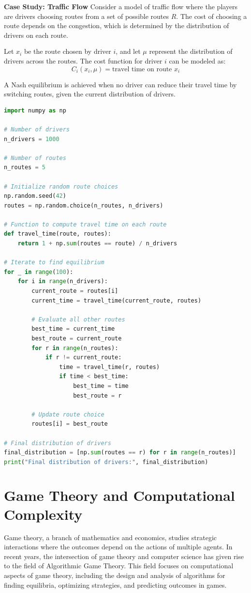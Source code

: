 \documentclass[12pt]{book} %
\begin{document}
\textbf{Case Study: Traffic Flow}
Consider a model of traffic flow where the players are drivers choosing routes from a set of possible routes $R$. The cost of choosing a route depends on the congestion, which is determined by the distribution of drivers on each route.

Let $x_i$ be the route chosen by driver $i$, and let $\mu$ represent the distribution of drivers across the routes. The cost function for driver $i$ can be modeled as:
\[
C_i(x_i, \mu) = \text{travel time on route } x_i
\]

A Nash equilibrium is achieved when no driver can reduce their travel time by switching routes, given the current distribution of drivers.

\FloatBarrier
\begin{lstlisting}[language=Python, caption=Simulation of Traffic Flow]
import numpy as np

# Number of drivers
n_drivers = 1000

# Number of routes
n_routes = 5

# Initialize random route choices
np.random.seed(42)
routes = np.random.choice(n_routes, n_drivers)

# Function to compute travel time on each route
def travel_time(route, routes):
    return 1 + np.sum(routes == route) / n_drivers

# Iterate to find equilibrium
for _ in range(100):
    for i in range(n_drivers):
        current_route = routes[i]
        current_time = travel_time(current_route, routes)
        
        # Evaluate all other routes
        best_time = current_time
        best_route = current_route
        for r in range(n_routes):
            if r != current_route:
                time = travel_time(r, routes)
                if time < best_time:
                    best_time = time
                    best_route = r
        
        # Update route choice
        routes[i] = best_route

# Final distribution of drivers
final_distribution = [np.sum(routes == r) for r in range(n_routes)]
print("Final distribution of drivers:", final_distribution)
\end{lstlisting}
\FloatBarrier


\section{Game Theory and Computational Complexity}
Game theory, a branch of mathematics and economics, studies strategic interactions where the outcomes depend on the actions of multiple agents. In recent years, the intersection of game theory and computer science has given rise to the field of Algorithmic Game Theory. This field focuses on computational aspects of game theory, including the design and analysis of algorithms for finding equilibria, optimizing strategies, and predicting outcomes in games.
\end{document}
